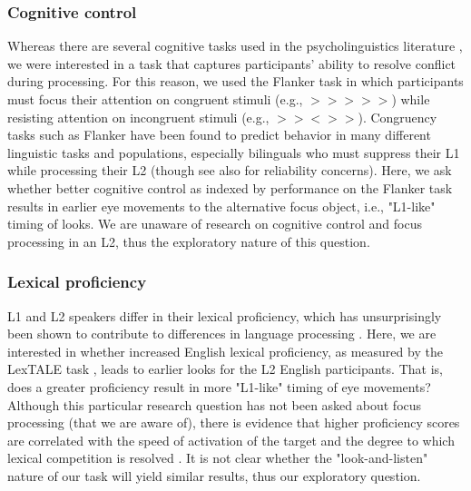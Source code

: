 \subsubsection{Cognitive control}
Whereas there are several cognitive tasks used in the psycholinguistics literature \citep{ness2023state}, we were interested in a task that captures participants' ability to resolve conflict during processing. For this reason, we used the Flanker task \citep{eriksen1974effects} in which 
participants must focus their attention on congruent stimuli (e.g., $>>>>>$) while resisting attention on incongruent stimuli (e.g., $>><>>$). Congruency tasks such as Flanker have been found to predict behavior in many different linguistic tasks and populations, especially bilinguals who must suppress their L1 while processing their L2 \citep{blumenfeld2014cognitive,luk2011there} (though see also \cite{hedge2018reliability} for reliability concerns). Here, we ask whether better cognitive control as indexed by performance on the Flanker task results in earlier eye movements to the alternative focus object, i.e., "L1-like" timing of looks. We are unaware of research on cognitive control and focus processing in an L2, thus the exploratory nature of this question.



\subsubsection{Lexical proficiency}
L1 and L2 speakers differ in their lexical proficiency, which has unsurprisingly been shown to contribute to differences in language processing \citep{Yap2012, zareva2005relationship}. Here, we are interested in whether increased English lexical proficiency, as measured by the LexTALE task \citep{lemhofer2012introducing}, leads to earlier looks for the L2 English participants. That is, does a greater proficiency result in more "L1-like" timing of eye movements? Although this particular research question has not been asked about focus processing (that we are aware of), there is evidence that higher proficiency scores are correlated with the speed of activation of the target and the degree to which lexical competition is resolved \citep{sarrett2022within}. It is not clear whether the "look-and-listen" nature of our task will yield similar results, thus our exploratory question.

 

